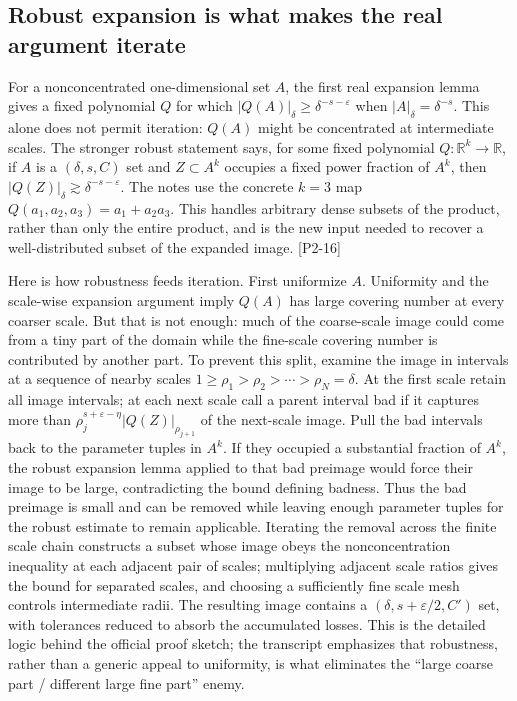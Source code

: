 \subsection{Robust expansion is what makes the real argument iterate}\label{04-visual-computing-ii-ch033-robust-expansion-is-what-makes-the-real-argument-iterate-1}

For a nonconcentrated one-dimensional set \(A\), the first real expansion lemma gives a fixed polynomial \(Q\) for which \(|Q(A)|_\delta\ge\delta^{-s-\varepsilon}\) when \(|A|_\delta=\delta^{-s}\). This alone does not permit iteration: \(Q(A)\) might be concentrated at intermediate scales. The stronger robust statement says, for some fixed polynomial \(Q:\mathbb R^k\to\mathbb R\), if \(A\) is a \((\delta,s,C)\) set and \(Z\subset A^k\) occupies a fixed power fraction of \(A^k\), then \(|Q(Z)|_\delta\gtrsim\delta^{-s-\varepsilon}\). The notes use the concrete \(k=3\) map \(Q(a_1,a_2,a_3)=a_1+a_2a_3\). This handles arbitrary dense subsets of the product, rather than only the entire product, and is the new input needed to recover a well-distributed subset of the expanded image. {[}P2-16{]}

Here is how robustness feeds iteration. First uniformize \(A\). Uniformity and the scale-wise expansion argument imply \(Q(A)\) has large covering number at every coarser scale. But that is not enough: much of the coarse-scale image could come from a tiny part of the domain while the fine-scale covering number is contributed by another part. To prevent this split, examine the image in intervals at a sequence of nearby scales \(1\ge\rho_1>\rho_2>\cdots>\rho_N=\delta\). At the first scale retain all image intervals; at each next scale call a parent interval bad if it captures more than \(\rho_j^{s+\varepsilon-\eta}|Q(Z)|_{\rho_{j+1}}\) of the next-scale image. Pull the bad intervals back to the parameter tuples in \(A^k\). If they occupied a substantial fraction of \(A^k\), the robust expansion lemma applied to that bad preimage would force their image to be large, contradicting the bound defining badness. Thus the bad preimage is small and can be removed while leaving enough parameter tuples for the robust estimate to remain applicable. Iterating the removal across the finite scale chain constructs a subset whose image obeys the nonconcentration inequality at each adjacent pair of scales; multiplying adjacent scale ratios gives the bound for separated scales, and choosing a sufficiently fine scale mesh controls intermediate radii. The resulting image contains a \((\delta,s+\varepsilon/2,C')\) set, with tolerances reduced to absorb the accumulated losses. This is the detailed logic behind the official proof sketch; the transcript emphasizes that robustness, rather than a generic appeal to uniformity, is what eliminates the ``large coarse part / different large fine part'' enemy.

